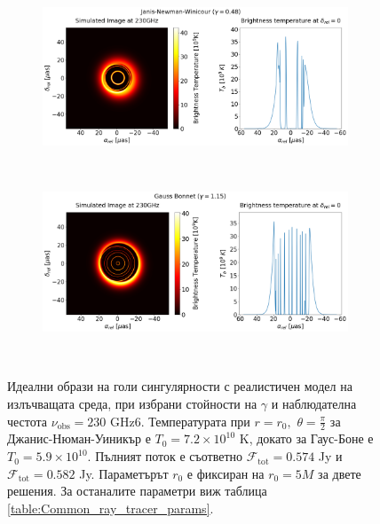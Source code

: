 \begin{figure}[h!]
	\centering
	\begin{subfigure}{12cm}
		\hspace{-1cm}
		\includegraphics[scale = 0.3]{Ray_tracer_plot_230_JNW.png}
	\end{subfigure}\\
	\begin{subfigure}{12cm}
		\hspace{-1cm}
		\includegraphics[scale = 0.3]{Ray_tracer_plot_230_GB.png}
	\end{subfigure}\\
	\label{Naked_Singularity_Ray_tracer_230}
	\caption[Идеални образи на голи сингулярности с реалистичен модел на излъчващата среда, при избрани стойности на $\gamma$ и наблюдателна честота $\nu_\text{obs} = 230$ GHz.]{\small Идеални образи на голи сингулярности с реалистичен модел на излъчващата среда, при избрани стойности на $\gamma$ и наблюдателна честота $\nu_\text{obs} = 230$ GHz6. Температурата при $r = r_0,\,\,\theta = \frac{\pi}{2}$ за Джанис-Нюман-Уиникър е $T_0 = 7.2\times10^{10}$ K, докато за Гаус-Боне е $T_0 = 5.9\times10^{10}$. Пълният поток е съответно $\mathcal{F}_{\text{tot}} = 0.574$ Jy и $\mathcal{F}_{\text{tot}} = 0.582$ Jy. Параметърът $r_0$ е фиксиран на $r_0 = 5M$ за двете решения. За останалите параметри виж таблица \ref{table:Common_ray_tracer_params}.} 
\end{figure}


